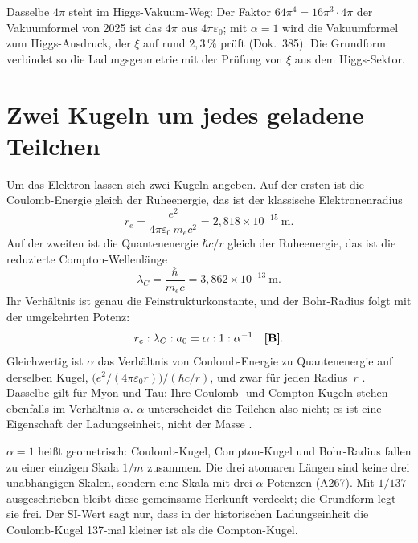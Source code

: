Dasselbe $4\pi$ steht im Higgs-Vakuum-Weg: Der Faktor $64\pi^4=16\pi^3\cdot4\pi$ der Vakuumformel
von 2025 ist das $4\pi$ aus $4\pi\varepsilon_0$; mit $\alpha=1$ wird die Vakuumformel zum
Higgs-Ausdruck, der $\xi$ auf rund $2{,}3\,\%$ prüft (Dok.~385). Die Grundform verbindet so die
Ladungsgeometrie mit der Prüfung von $\xi$ aus dem Higgs-Sektor.

\section{Zwei Kugeln um jedes geladene Teilchen}

Um das Elektron lassen sich zwei Kugeln angeben. Auf der ersten ist die Coulomb-Energie gleich
der Ruheenergie, das ist der klassische Elektronenradius
\begin{equation}
  r_e=\frac{e^2}{4\pi\varepsilon_0\,m_ec^2}=2{,}818\times10^{-15}\ \text{m}.
\end{equation}
Auf der zweiten ist die Quantenenergie $\hbar c/r$ gleich der Ruheenergie, das ist die reduzierte
Compton-Wellenlänge
\begin{equation}
  \lambda_C=\frac{\hbar}{m_ec}=3{,}862\times10^{-13}\ \text{m}.
\end{equation}
Ihr Verhältnis ist genau die Feinstrukturkonstante, und der Bohr-Radius folgt mit der
umgekehrten Potenz:
\begin{equation}
  r_e:\lambda_C:a_0=\alpha:1:\alpha^{-1}\quad\textbf{[B]} .
\end{equation}
Gleichwertig ist $\alpha$ das Verhältnis von Coulomb-Energie zu Quantenenergie auf derselben
Kugel, $\bigl(e^2/(4\pi\varepsilon_0r)\bigr)/(\hbar c/r)$, und zwar für jeden Radius~$r$ \KM. Dasselbe
gilt für Myon und Tau: Ihre Coulomb- und Compton-Kugeln stehen ebenfalls im Verhältnis $\alpha$.
$\alpha$ unterscheidet die Teilchen also nicht; es ist eine Eigenschaft der Ladungseinheit, nicht
der Masse \BM.

$\alpha=1$ heißt geometrisch: Coulomb-Kugel, Compton-Kugel und Bohr-Radius fallen zu einer
einzigen Skala $1/m$ zusammen. Die drei atomaren Längen sind keine drei unabhängigen Skalen,
sondern eine Skala mit drei $\alpha$-Potenzen (A267). Mit $1/137$ ausgeschrieben bleibt diese
gemeinsame Herkunft verdeckt; die Grundform legt sie frei. Der SI-Wert sagt nur, dass in der
historischen Ladungseinheit die Coulomb-Kugel 137-mal kleiner ist als die Compton-Kugel.

